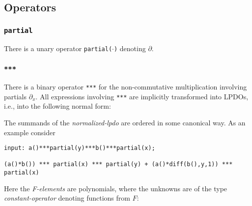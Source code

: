 \subsection{Operators}

\subsubsection{\texttt{partial}}
There is a unary operator \texttt{partial($\cdot$)} denoting
$\partial$.

\begin{center}
  \begin{ebnf}
  \end{ebnf}
\end{center}

\subsubsection{\texttt{***}}
There is a binary operator \texttt{***} for the non-commutative
multiplication involving partials $\partial_x$. All expressions
involving \texttt{***} are implicitly transformed into LPDOs, i.e.,
into the following normal form:
\begin{center}
  \begin{ebnf}
  \end{ebnf}
\end{center}
The summands of the \textit{normalized-lpdo} are ordered in some
canonical way. As an example consider

\begin{footnotesize}
\begin{verbatim}
input: a()***partial(y)***b()***partial(x);

(a()*b()) *** partial(x) *** partial(y) + (a()*diff(b(),y,1)) *** partial(x)
\end{verbatim}
\end{footnotesize}
Here the \textit{F-elements} are polynomials, where the unknowns are
of the type \emph{constant-operator} denoting functions from $F$:

